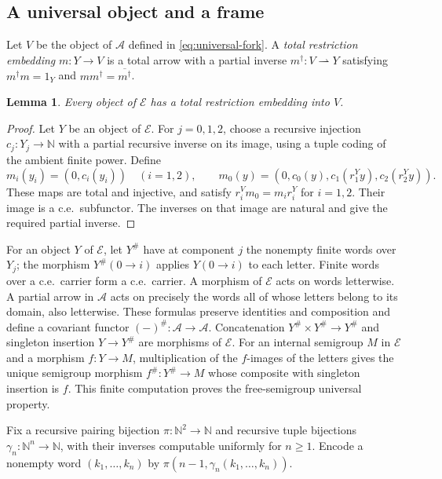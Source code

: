 \documentclass[11pt]{article}
\newtheorem{lemma}[theorem]{Lemma}
\newcommand{\N}{\mathbb N}
\begin{document}
\subsection{A universal object and a frame}

Let $V$ be the object of $\mathcal A$ defined in
\eqref{eq:universal-fork}.
A \emph{total restriction embedding} $m:Y\to V$ is a total
arrow with a partial inverse $m^\dagger:V\rightharpoonup Y$
satisfying $m^\dagger m=1_Y$ and $mm^\dagger=\overline{m^\dagger}$.

\begin{lemma}\label{lem:fork-dominance}
Every object of $\mathcal E$ has a total restriction embedding
into $V$.
\end{lemma}
\begin{proof}
Let $Y$ be an object of $\mathcal E$. For $j=0,1,2$, choose a
recursive injection $c_j:Y_j\to\N$
with a partial recursive inverse on its image, using a tuple
coding of the ambient finite power. Define
\[
 m_i(y_i)=(0,c_i(y_i))\quad(i=1,2),\qquad
 m_0(y)=(0,c_0(y),c_1(r_1^Yy),c_2(r_2^Yy)).
\]
These maps are total and injective, and satisfy
$r_i^Vm_0=m_i r_i^Y$ for $i=1,2$.
Their image is a c.e.\ subfunctor. The inverses on that image
are natural and give the required partial inverse.
\end{proof}

For an object $Y$ of $\mathcal E$, let $Y^\#$ have at component $j$ the
nonempty finite words over $Y_j$; the morphism $Y^\#(0\to i)$
applies $Y(0\to i)$ to each letter. Finite words over a c.e.\ carrier form
a c.e.\ carrier. A morphism of $\mathcal E$ acts on words letterwise.
A partial arrow in $\mathcal A$ acts on precisely the words all of whose
letters belong to its domain, also letterwise. These formulas
preserve identities and composition and define a covariant functor
$(-)^\#:\mathcal A\to\mathcal A$. Concatenation
$Y^\#\times Y^\#\to Y^\#$ and singleton insertion
$Y\to Y^\#$ are morphisms of $\mathcal E$. For an internal semigroup $M$
in $\mathcal E$ and a morphism $f:Y\to M$, multiplication of the
$f$-images of the letters gives the unique semigroup morphism
$f^\#:Y^\#\to M$ whose composite with singleton insertion is $f$.
This finite computation proves the free-semigroup universal property.

Fix a recursive pairing bijection
$\pi:\N^2\to\N$ and recursive tuple bijections
$\gamma_n:\N^n\to\N$, with their inverses computable uniformly
for $n\ge1$. Encode a nonempty word $(k_1,\ldots,k_n)$ by
$\pi(n-1,\gamma_n(k_1,\ldots,k_n))$.
\end{document}
